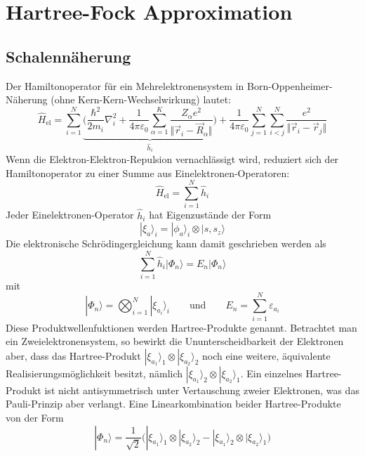 \documentclass[9pt]{report}
\begin{document}
\section{Hartree-Fock Approximation}

\subsection{Schalennäherung}
Der Hamiltonoperator für ein Mehrelektronensystem in Born-Oppenheimer-Näherung (ohne Kern-Kern-Wechselwirkung) lautet:
\begin{equation}
\hat{H}_{\mathrm{el}}=\sum_{i=1}^{N}\underbrace{\bigg(\frac{\hbar^2}{2m_i}\nabla_{i}^{2}+\frac{1}{4\pi\varepsilon_0}\sum_{\alpha=1}^{K}\frac{Z_{\alpha}e^2}{\Vert\vec{r}_{i}-\vec{R}_{\alpha}\Vert}\bigg)}_{\hat{h}_{i}}+\frac{1}{4\pi\varepsilon_0}\sum_{j=1}^{N}\sum_{i<j}^{N}\frac{e^2}{\Vert\vec{r}_{i}-\vec{r}_{j}\Vert}
\end{equation}
Wenn die Elektron-Elektron-Repulsion vernachlässigt wird, reduziert sich der Hamiltonoperator zu einer Summe aus Einelektronen-Operatoren:
\begin{equation}
\hat{H}_{\mathrm{el}}=\sum_{i=1}^{N}\hat{h}_{i}
\end{equation}
Jeder Einelektronen-Operator $\hat{h}_{i}$ hat Eigenzustände der Form
\begin{equation}
|\xi_a\rangle_i =|\phi_a\rangle_i\otimes|s,s_{z}\rangle
\end{equation}
Die elektronische Schrödingergleichung kann damit geschrieben werden als
\begin{equation}
\sum_{i=1}^{N}\hat{h}_{i}|\Phi_{n}\rangle=E_{n}|\Phi_{n}\rangle
\end{equation}
mit
\begin{equation}
|\Phi_{n}\rangle=\bigotimes_{i=1}^{N}|\xi_{a_i}\rangle_i\qquad\mathrm{und}\qquad E_{n}=\sum_{i=1}^{N}\varepsilon_{a_i}
\end{equation}
Diese Produktwellenfuktionen werden Hartree-Produkte genannt. Betrachtet man ein Zweielektronensystem, so bewirkt die Ununterscheidbarkeit der Elektronen aber, dass das Hartree-Produkt $|\xi_{a_1}\rangle_1\otimes|\xi_{a_2}\rangle_2$ noch eine weitere, äquivalente Realisierungsmöglichkeit besitzt, nämlich $|\xi_{a_1}\rangle_2\otimes|\xi_{a_2}\rangle_1$. Ein einzelnes Hartree-Produkt ist nicht antisymmetrisch unter Vertauschung zweier Elektronen, was das Pauli-Prinzip aber verlangt. Eine Linearkombination beider Hartree-Produkte von der Form
\begin{equation}
|\Phi_{n}\rangle = \frac{1}{\sqrt{2}}\Big(|\xi_{a_1}\rangle_1\otimes|\xi_{a_2}\rangle_2 - |\xi_{a_1}\rangle_2\otimes|\xi_{a_2}\rangle_1\Big)
\end{equation}
\end{document}
